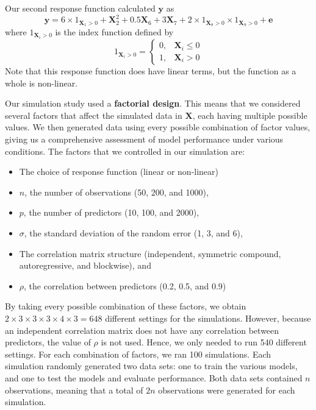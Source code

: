 \documentclass{article}
\begin{document}
	Our second response function calculated $\mathbf{y}$ as
	\begin{equation}\label{eqn:nonlinear-response}
		\mathbf{y} = 6\times 1_{\mathbf{X}_1>0} + \mathbf{X}_2^2 + 0.5\mathbf{X}_6 + 3\mathbf{X}_7 + 2\times 1_{\mathbf{X}_8>0}\times 1_{\mathbf{X}_9>0} + \mathbf{e}
	\end{equation}
	where $1_{\mathbf{X}_i>0}$ is the index function defined by
	\begin{equation}
		1_{\mathbf{X}_i>0} = \left\{\begin{array}{ll}
			0, &\mathbf{X}_i \leq 0 \\
			1, &\mathbf{X}_i > 0
		\end{array}\right.
	\end{equation}
	Note that this response function does have linear terms, but the function as a whole is non-linear.
	
	Our simulation study used a \textbf{factorial design}. This means that we considered several factors that affect the simulated data in $\mathbf{X}$, each having multiple possible values. We then generated data using every possible combination of factor values, giving us a comprehensive assessment of model performance under various conditions. The factors that we controlled in our simulation are:
	\begin{itemize}
		\item The choice of response function (linear or non-linear)
		\item $n$, the number of observations (50, 200, and 1000),
		\item $p$, the number of predictors (10, 100, and 2000),
		\item $\sigma$, the standard deviation of the random error (1, 3, and 6),
		\item The correlation matrix structure (independent, symmetric compound, autoregressive, and blockwise), and
		\item $\rho$, the correlation between predictors (0.2, 0.5, and 0.9)
	\end{itemize}
	
	By taking every possible combination of these factors, we obtain $2\times 3\times 3\times 3\times 4\times 3 = 648$ different settings for the simulations. However, because an independent correlation matrix does not have any correlation between predictors, the value of $\rho$ is not used. Hence, we only needed to run 540 different settings. For each combination of factors, we ran 100 simulations. Each simulation randomly generated two data sets: one to train the various models, and one to test the models and evaluate performance. Both data sets contained $n$ observations, meaning that a total of $2n$ observations were generated for each simulation.
	
\end{document}

